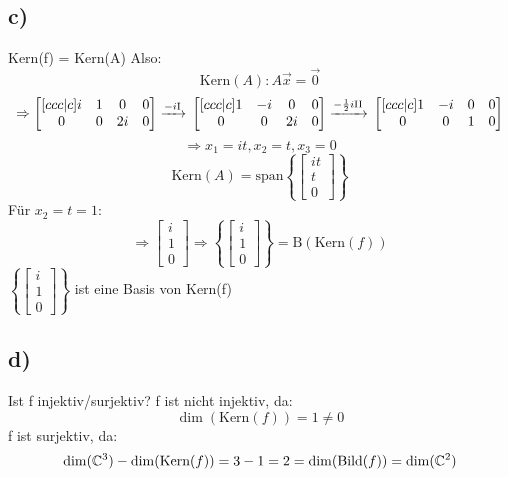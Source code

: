 \documentclass[a4paper, 11pt]{article}
\begin{document}
\subsection{c)}
\label{sec:org3d0c9fa}
Kern(f) = Kern(A)
Also:
$$\text{Kern}(A): A\overrightarrow{x} = \overrightarrow{0}$$
$$\Rightarrow \begin{bmatrix}[ccc|c] i & 1 & 0 & 0\\ 0 & 0 & 2i & 0\end{bmatrix} \xrightarrow{-i\text{I}} \\
\begin{bmatrix}[ccc|c] 1 & -i & 0 & 0\\ 0 & 0 & 2i & 0\end{bmatrix}  \xrightarrow{-\frac{1}{2}i\text{II}} \\
\begin{bmatrix}[ccc|c] 1 & -i & 0 & 0\\ 0 & 0 & 1 & 0\end{bmatrix}$$
$$\Rightarrow x_1 = it, x_2 = t, x_3 = 0$$
$$\text{Kern}(A) = \text{span}\left\{\begin{bmatrix} it \\ t\\ 0\end{bmatrix}\right\}$$
Für \(x_2 = t = 1\):
$$\Rightarrow \begin{bmatrix} i \\ 1\\ 0\end{bmatrix} \Rightarrow \left\{\begin{bmatrix} i \\ 1\\ 0\end{bmatrix}\right\} = \text{B}(\text{Kern}(f))$$
\(\left\{\begin{bmatrix} i \\ 1\\ 0\end{bmatrix}\right\}\) ist eine Basis von Kern(f)


\subsection{d)}
\label{sec:org0fce944}
Ist f injektiv/surjektiv?
\newline
\newline
f ist nicht injektiv, da: 
$$\dim(\text{Kern}(f)) = 1 \neq 0$$
f ist surjektiv, da: 
$$\dim(\mathbb{C}^3) - \dim(\text{Kern}(f)) = 3 -1 = 2 = \dim(\text{Bild}(f)) = \dim(\mathbb{C}^2)$$
\end{document}

